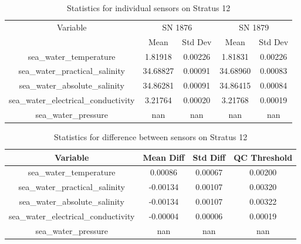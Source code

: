 \begin{table}[h]
\centering
\begin{tabular}{|c|c|c|c|c|}
\hline
Variable & \multicolumn{2}{c|}{SN 1876} & \multicolumn{2}{c|}{SN 1879} \\
& Mean & Std Dev & Mean & Std Dev \\
\hline
sea\_water\_temperature & 1.81918 & 0.00226 & 1.81831 & 0.00226 \\
sea\_water\_practical\_salinity & 34.68827 & 0.00091 & 34.68960 & 0.00083 \\
sea\_water\_absolute\_salinity & 34.86281 & 0.00091 & 34.86415 & 0.00084 \\
sea\_water\_electrical\_conductivity & 3.21764 & 0.00020 & 3.21768 & 0.00019 \\
sea\_water\_pressure & nan & nan & nan & nan \\
\hline
\end{tabular}
\caption{Statistics for individual sensors on Stratus 12}
\end{table}

\begin{table}[h]
\centering
\begin{tabular}{|c|c|c|c|}
\hline
Variable & Mean Diff & Std Diff & QC Threshold \\
\hline
sea\_water\_temperature & 0.00086 & 0.00067 & 0.00200 \\
sea\_water\_practical\_salinity & -0.00134 & 0.00107 & 0.00320 \\
sea\_water\_absolute\_salinity & -0.00134 & 0.00107 & 0.00322 \\
sea\_water\_electrical\_conductivity & -0.00004 & 0.00006 & 0.00019 \\
sea\_water\_pressure & nan & nan & nan \\
\hline
\end{tabular}
\caption{Statistics for difference between sensors on Stratus 12}
\end{table}
